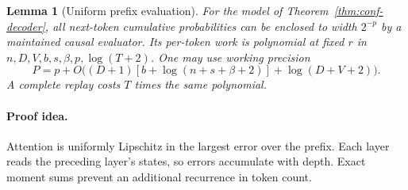\documentclass[11pt]{article}
\newtheorem{lemma}[theorem]{Lemma}
\theoremstyle{definition}\newtheorem{definition}[theorem]{Definition}
\theoremstyle{remark}\newtheorem{remark}[theorem]{Remark}
\numberwithin{equation}{section}
\begin{document}
\begin{lemma}[Uniform prefix evaluation]
\label{lem:conf-stability}
For the model of Theorem~\ref{thm:conf-decoder}, all next-token
cumulative probabilities can be enclosed to width $2^{-p}$ by a
maintained causal evaluator. Its per-token work is polynomial at fixed
$r$ in $n,D,V,b,s,\beta,p,\log(T+2)$. One may use working precision
\begin{equation}
 P=p+O\bigl((D+1)[b+\log(n+s+\beta+2)]+\log(D+V+2)\bigr).
 \label{eq:conf-P}
\end{equation}
A complete replay costs $T$ times the same polynomial.
\end{lemma}
\paragraph{Proof idea.}
Attention is uniformly Lipschitz in the largest error over the prefix.
Each layer reads the preceding layer's states, so errors accumulate with
depth. Exact moment sums prevent an additional recurrence in token count.
\end{document}
